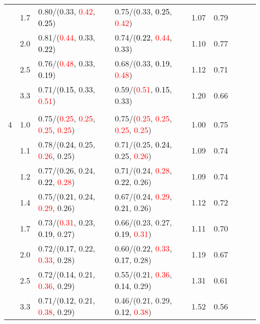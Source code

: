 \documentclass[10pt,a4paper]{report}
\begin{document}
\begin{table}[!htbp]
\begin{center}
{\begin{tabular}{ccllccccc}
			&1.7&0.80/(0.33, \textcolor{red}{0.42}, \textcolor{black}{0.25})&0.75/(0.33, \textcolor{black}{0.25}, \textcolor{red}{0.42})&1.07&0.79\\
			&2.0&0.81/(\textcolor{red}{0.44}, 0.33, \textcolor{black}{0.22})&0.74/(\textcolor{black}{0.22}, \textcolor{red}{0.44}, 0.33)&1.10&0.77\\
			&2.5&0.76/(\textcolor{red}{0.48}, 0.33, \textcolor{black}{0.19})&0.68/(0.33, \textcolor{black}{0.19}, \textcolor{red}{0.48})&1.12&0.71\\
			&3.3&0.71/(\textcolor{black}{0.15}, 0.33, \textcolor{red}{0.51})&0.59/(\textcolor{red}{0.51}, \textcolor{black}{0.15}, 0.33)&1.20&0.66\\
			&&&&\\
			4			&1.0&0.75/(\textcolor{red}{0.25}, \textcolor{red}{0.25}, \textcolor{red}{0.25}, \textcolor{red}{0.25})&0.75/(\textcolor{red}{0.25}, \textcolor{red}{0.25}, \textcolor{red}{0.25}, \textcolor{red}{0.25})&1.00&0.75\\
			&1.1&0.78/(\textcolor{black}{0.24}, 0.25, \textcolor{red}{0.26}, 0.25)&0.71/(0.25, \textcolor{black}{0.24}, 0.25, \textcolor{red}{0.26})&1.09&0.74\\
			&1.2&0.77/(0.26, 0.24, \textcolor{black}{0.22}, \textcolor{red}{0.28})&0.71/(0.24, \textcolor{red}{0.28}, \textcolor{black}{0.22}, 0.26)&1.09&0.74\\
			&1.4&0.75/(\textcolor{black}{0.21}, 0.24, \textcolor{red}{0.29}, 0.26)&0.67/(0.24, \textcolor{red}{0.29}, \textcolor{black}{0.21}, 0.26)&1.12&0.72\\
			&1.7&0.73/(\textcolor{red}{0.31}, 0.23, \textcolor{black}{0.19}, 0.27)&0.66/(0.23, 0.27, \textcolor{black}{0.19}, \textcolor{red}{0.31})&1.11&0.70\\
			&2.0&0.72/(\textcolor{black}{0.17}, 0.22, \textcolor{red}{0.33}, 0.28)&0.60/(0.22, \textcolor{red}{0.33}, \textcolor{black}{0.17}, 0.28)&1.19&0.67\\
			&2.5&0.72/(\textcolor{black}{0.14}, 0.21, \textcolor{red}{0.36}, 0.29)&0.55/(0.21, \textcolor{red}{0.36}, \textcolor{black}{0.14}, 0.29)&1.31&0.61\\
			&3.3&0.71/(\textcolor{black}{0.12}, 0.21, \textcolor{red}{0.38}, 0.29)&0.46/(0.21, 0.29, \textcolor{black}{0.12}, \textcolor{red}{0.38})&1.52&0.56\\
			\bottomrule
		\end{tabular}}
	\end{center}
\end{table}
\end{document}
